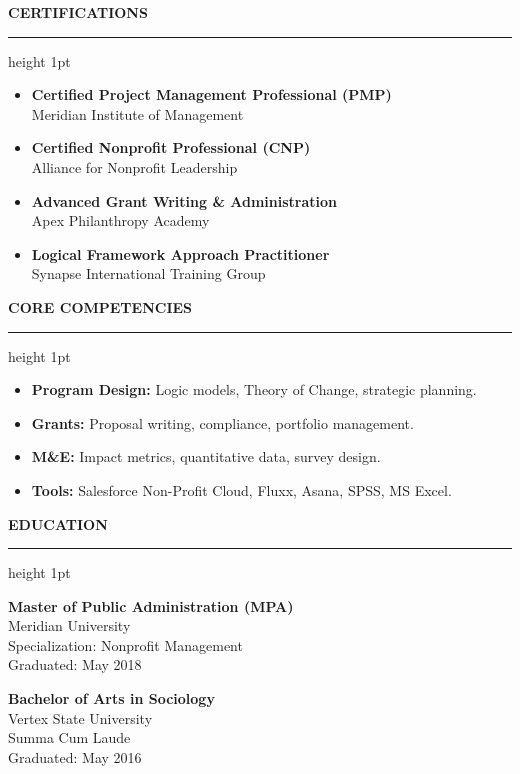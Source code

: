 \documentclass[10pt,oneside]{article}
\newcommand{\resumesection}[1]{%
  \vspace{0.6em}%
  {\color{primary}\MakeUppercase{\textbf{#1}}}%
  \vspace{0.2em}%
  {\color{primary}\hrule height 1pt}%
  \vspace{0.4em}%
}
\begin{document}
\hfill%
\begin{minipage}[t]{0.33\textwidth}
  \resumesection{Certifications}
  \begin{itemize}[leftmargin=1.0em, itemsep=0.4em]
    \item[\textcolor{primary}{\faCheckCircle}] \textbf{Certified Project Management Professional (PMP)} \\
    {\small Meridian Institute of Management}
    
    \item[\textcolor{primary}{\faCheckCircle}] \textbf{Certified Nonprofit Professional (CNP)} \\
    {\small Alliance for Nonprofit Leadership}
    
    \item[\textcolor{primary}{\faCheckCircle}] \textbf{Advanced Grant Writing \& Administration} \\
    {\small Apex Philanthropy Academy}
    
    \item[\textcolor{primary}{\faCheckCircle}] \textbf{Logical Framework Approach Practitioner} \\
    {\small Synapse International Training Group}
  \end{itemize}
  
  \vspace{0.8em}
  
  \resumesection{Core Competencies}
  \begin{itemize}[leftmargin=1.0em, itemsep=0.4em]
    \item[\textcolor{primary}{\small\faCircle}] \textbf{Program Design:} Logic models, Theory of Change, strategic planning.
    \item[\textcolor{primary}{\small\faCircle}] \textbf{Grants:} Proposal writing, compliance, portfolio management.
    \item[\textcolor{primary}{\small\faCircle}] \textbf{M\&E:} Impact metrics, quantitative data, survey design.
    \item[\textcolor{primary}{\small\faCircle}] \textbf{Tools:} Salesforce Non-Profit Cloud, Fluxx, Asana, SPSS, MS Excel.
  \end{itemize}
  
  \vspace{0.8em}
  
  \resumesection{Education}
  \textbf{Master of Public Administration (MPA)} \\
  {\small Meridian University \\ Specialization: Nonprofit Management \\ Graduated: May 2018}
  
  \vspace{0.6em}
  
  \textbf{Bachelor of Arts in Sociology} \\
  {\small Vertex State University \\ Summa Cum Laude \\ Graduated: May 2016}
\end{minipage}
\end{document}
